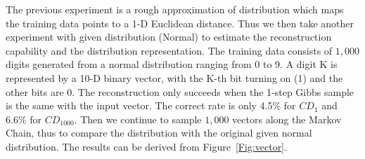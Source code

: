 \documentclass[11pt,twoside,a4paper]{article}
\begin{document}

The previous experiment is a rough approximation of distribution which maps the training data points to a 1-D Euclidean distance.
Thus we then take another experiment with given distribution (Normal) to estimate the reconstruction capability and the distribution representation.
The training data consists of $1,000$ digits generated from a normal distribution ranging from 0 to 9.
A digit K is represented by a 10-D binary vector, with the K-th bit turning on (1) and the other bits are 0.
The reconstruction only succeeds when the 1-step Gibbs sample is the same with the input vector.
The correct rate is only 4.5\% for $CD_{1}$ and 6.6\% for $CD_{1000}$.
Then we continue to sample $1,000$ vectors along the Markov Chain, thus to compare the distribution with the original given normal distribution.
The results can be derived from Figure~\ref{Fig:vector}.
\end{document}
